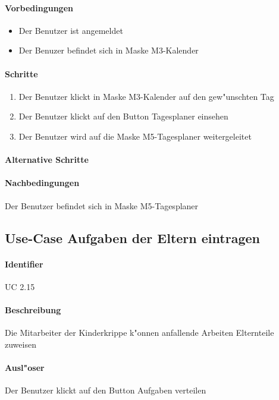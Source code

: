   \paragraph{Vorbedingungen}
  \begin{itemize}
   \item Der Benutzer ist angemeldet
   \item Der Benuzer befindet sich in Maske M3-Kalender
  \end{itemize}

  \paragraph{Schritte}
  \begin{enumerate}
   \item Der Benutzer klickt in Maske M3-Kalender auf den gew"unschten Tag
   \item Der Benutzer klickt auf den Button \dq Tagesplaner einsehen\dq
   \item Der Benutzer wird auf die Maske M5-Tagesplaner weitergeleitet
  \end{enumerate}

  \paragraph{Alternative Schritte}
  \paragraph{Nachbedingungen}
  Der Benutzer befindet sich in Maske M5-Tagesplaner

 
 \newpage
 \subsection{Use-Case Aufgaben der Eltern eintragen}
  \paragraph{Identifier}
  UC 2.15
  \paragraph{Beschreibung}
  Die Mitarbeiter der Kinderkrippe k"onnen anfallende Arbeiten Elternteile zuweisen
  \paragraph{Ausl"oser}
  Der Benutzer klickt auf den Button \dq Aufgaben verteilen\dq
